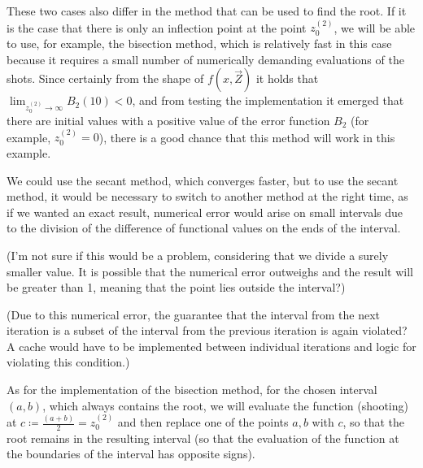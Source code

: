 \begin{example}
	These two cases also differ in the method that can be used to find the root. If it is the case that there is only an inflection point at the point $z^{(2)}_{0}$, we will be able to use, for example, the bisection method, which is relatively fast in this case because it requires a small number of numerically demanding evaluations of the shots. Since certainly from the shape of $f(x, \vec{Z})$ it holds that $\lim_{z^{(2)}_{0} \to \infty} B_{2}(10) < 0$, and from testing the implementation it emerged that there are initial values with a positive value of the error function $B_{2}$ (for example, $z^{(2)}_{0} = 0$), there is a good chance that this method will work in this example.

	\begin{remark}
		We could use the secant method, which converges faster, but to use the secant method, it would be necessary to switch to another method at the right time, as if we wanted an exact result, numerical error would arise on small intervals due to the division of the difference of functional values on the ends of the interval.

		(I'm not sure if this would be a problem, considering that we divide a surely smaller value. It is possible that the numerical error outweighs and the result will be greater than 1, meaning that the point lies outside the interval?)

		(Due to this numerical error, the guarantee that the interval from the next iteration is a subset of the interval from the previous iteration is again violated? A cache would have to be implemented between individual iterations and logic for violating this condition.)
	\end{remark}

	As for the implementation of the bisection method, for the chosen interval $(a,b)$, which always contains the root, we will evaluate the function (shooting) at $ c \coloneqq \frac{(a+b)}{2} = z^{(2)}_{0}$ and then replace one of the points $a,b$ with $c$, so that the root remains in the resulting interval (so that the evaluation of the function at the boundaries of the interval has opposite signs).\pagebreak
\end{example}

